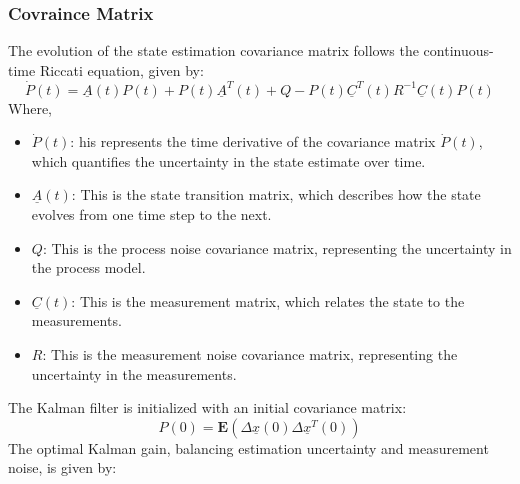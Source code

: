 \subsubsection{Covraince Matrix}
The evolution of the state estimation covariance matrix follows the continuous-time Riccati equation, given by:
\begin{equation}
\dot{P}(t) = \underline{A}(t) P(t) + P(t) \underline{A}^T(t) + Q - P(t) \underline{C}^T(t) R^{-1} \underline{C}(t) P(t)  \label{eq:eq}
\end{equation}
Where, 
\begin{itemize}
	\item $\dot{P}(t)$: his represents the time derivative of the covariance matrix $\dot{P}(t)$, which quantifies the uncertainty in the state estimate over time.
	\item $\underline{A}(t)$: This is the state transition matrix, which describes how the state evolves from one time step to the next.
	\item $Q$: This is the process noise covariance matrix, representing the uncertainty in the process model.
	\item $\underline{C}(t)$: This is the measurement matrix, which relates the state to the measurements.
	\item $R$: This is the measurement noise covariance matrix, representing the uncertainty in the measurements.
\end{itemize}
The Kalman filter is initialized with an initial covariance matrix:
\begin{equation}
	P(0) = \mathbf{E}(\Delta\underline{x}(0) \Delta\underline{x}^T(0))  \label{eq:eq}
\end{equation}
The optimal Kalman gain, balancing estimation uncertainty and measurement noise, is given by:

